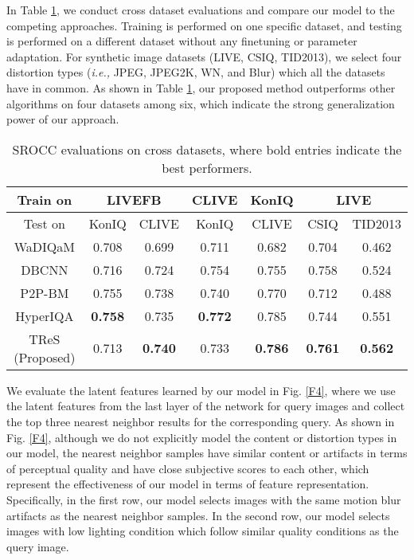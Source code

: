 \documentclass[10pt,twocolumn,letterpaper]{article}
\begin{document}
In Table \ref{TB2}, we conduct cross dataset evaluations and compare our model to the   competing approaches. 
Training is performed
on one specific dataset, and testing is performed on a different dataset without any finetuning or  parameter adaptation. 
For synthetic image datasets (LIVE, CSIQ, TID2013), we select four   distortion types  (\textit{i.e.,} JPEG, JPEG2K, WN,
and Blur) which all the datasets have in common.
 As shown in Table \ref{TB2}, our proposed method outperforms other algorithms on four datasets among six, which  indicate
the strong generalization power of our approach.
 
 
 
 
 
 
 
 
 
 
\begin{table}[h]
\centering
\caption{SROCC evaluations on cross  datasets, where bold entries indicate the best performers.}
\resizebox{3.2 in}{!} {
\begin{tabular}{c|cc|c|c|c|c}
\hline 
Train on & \multicolumn{2}{c|}{LIVEFB} & CLIVE & KonIQ & \multicolumn{2}{c}{LIVE}\tabularnewline
\hline 
Test on & KonIQ & CLIVE & KonIQ & CLIVE & CSIQ & TID2013\tabularnewline
\hline 
WaDIQaM\cite{bosse2017deep} & 0.708 & 0.699 & 0.711 & 0.682 & 0.704 & 0.462\tabularnewline
DBCNN\cite{zhang2018blind} & 0.716 & 0.724 & 0.754 & 0.755 & 0.758 & 0.524\tabularnewline
P2P-BM\cite{ying2019patches} & 0.755 & 0.738 & 0.740 & 0.770 & 0.712 & 0.488\tabularnewline
HyperIQA\cite{su2020blindly} & \textbf{0.758} & 0.735 & \textbf{0.772} & 0.785 & 0.744 & 0.551\tabularnewline
TReS (Proposed) & 0.713 & \textbf{0.740} & 0.733 & \textbf{0.786} & \textbf{0.761} & \textbf{0.562}\tabularnewline
\hline 
\end{tabular}
}
\label{TB2}
\end{table}



We evaluate the latent features learned by our model in Fig. \ref{F4}, where we use the latent features from the last layer of the network for query images and collect the top three nearest neighbor results for the corresponding query. As shown in Fig. \ref{F4}, although we do not explicitly model the content or distortion types in our model, the nearest neighbor samples have similar content or artifacts in terms of perceptual quality and have close subjective scores to each other, which represent the effectiveness of our model in terms of feature representation.
Specifically, in the first row, our model selects images with the same motion blur artifacts as the nearest neighbor samples. In the second row, our model selects images with low lighting condition which follow similar quality conditions as the query image. 
\end{document}
